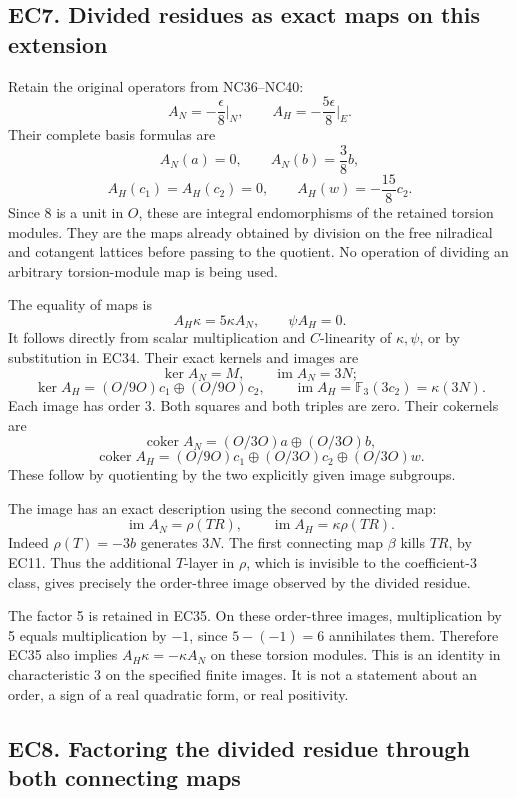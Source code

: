 \documentclass[
  10pt,
  a4paper,
]{article}
\begin{document}
\subsection{EC7. Divided residues as exact maps on this
extension}\label{ec7.-divided-residues-as-exact-maps-on-this-extension}

Retain the original operators from NC36--NC40: \[
A_N=-\frac{\epsilon}{8}\Big|_N,\qquad
A_H=-\frac{5\epsilon}{8}\Big|_E.
\tag{EC33}
\] Their complete basis formulas are \[
A_N(a)=0,\qquad A_N(b)=\frac38b,
\] \[
A_H(c_1)=A_H(c_2)=0,\qquad
A_H(w)=-\frac{15}{8}c_2.
\tag{EC34}
\] Since 8 is a unit in \(O\), these are integral endomorphisms of the
retained torsion modules. They are the maps already obtained by division
on the free nilradical and cotangent lattices before passing to the
quotient. No operation of dividing an arbitrary torsion-module map is
being used.

The equality of maps is \[
A_H\kappa=5\kappa A_N,\qquad\psi A_H=0.
\tag{EC35}
\] It follows directly from scalar multiplication and \(C\)-linearity of
\(\kappa,\psi\), or by substitution in EC34. Their exact kernels and
images are \[
\ker A_N=M,\qquad\operatorname{im}A_N=3N;
\] \[
\ker A_H=(O/9O)c_1\oplus(O/9O)c_2,\qquad
\operatorname{im}A_H=\mathbb F_3(3c_2)=\kappa(3N).
\tag{EC36}
\] Each image has order 3. Both squares and both triples are zero. Their
cokernels are \[
\operatorname{coker}A_N=(O/3O)a\oplus(O/3O)b,
\] \[
\operatorname{coker}A_H=(O/9O)c_1\oplus
(O/3O)c_2\oplus(O/3O)w.
\] These follow by quotienting by the two explicitly given image
subgroups.

The image has an exact description using the second connecting map: \[
\operatorname{im}A_N=\rho(TR),\qquad
\operatorname{im}A_H=\kappa\rho(TR).
\tag{EC37}
\] Indeed \(\rho(T)=-3b\) generates \(3N\). The first connecting map
\(\beta\) kills \(TR\), by EC11. Thus the additional \(T\)-layer in
\(\rho\), which is invisible to the coefficient-3 class, gives precisely
the order-three image observed by the divided residue.

The factor 5 is retained in EC35. On these order-three images,
multiplication by 5 equals multiplication by \(-1\), since \(5-(-1)=6\)
annihilates them. Therefore EC35 also implies \(A_H\kappa=-\kappa A_N\)
on these torsion modules. This is an identity in characteristic 3 on the
specified finite images. It is not a statement about an order, a sign of
a real quadratic form, or real positivity.

\subsection{EC8. Factoring the divided residue through both connecting
maps}\label{ec8.-factoring-the-divided-residue-through-both-connecting-maps}
\end{document}
